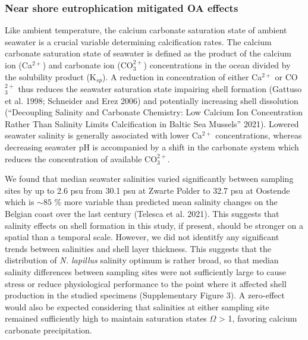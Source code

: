 \documentclass[smallextended]{svjour3}       %
\begin{document}
\hypertarget{near-shore-eutrophication-mitigated-oa-effects}{%
\subsubsection{Near shore eutrophication mitigated OA
effects}\label{near-shore-eutrophication-mitigated-oa-effects}}

Like ambient temperature, the calcium carbonate saturation state of
ambient seawater is a crucial variable determining calcification rates.
The calcium carbonate saturation state of seawater is defined as the
product of the calcium ion (Ca\(^{2+}\)) and carbonate ion
(CO\(_3^{2+}\)) concentrations in the ocean divided by the solubility
product (K\(_{sp}\)). A reduction in concentration of either Ca\(^{2+}\)
or CO\(_3^{2+}\) thus reduces the seawater saturation state impairing
shell formation (Gattuso et al. 1998; Schneider and Erez 2006) and
potentially increasing shell dissolution ({``Decoupling Salinity and
Carbonate Chemistry: Low Calcium Ion Concentration Rather Than Salinity
Limits Calcification in Baltic Sea Mussels''} 2021). Lowered seawater
salinity is generally associated with lower Ca\(^{2+}\) concentrations,
whereas decreasing seawater pH is accompanied by a shift in the
carbonate system which reduces the concentration of available
CO\(_3^{2+}\).

We found that median seawater salinities varied significantly between
sampling sites by up to 2.6 psu from 30.1 psu at Zwarte Polder to 32.7
psu at Oostende which is \(\sim85\) \% more variable than predicted mean
salinity changes on the Belgian coast over the last century (Telesca et
al. 2021). This suggests that salinity effects on shell formation in
this study, if present, should be stronger on a spatial than a temporal
scale. However, we did not identitfy any significant trends between
salinities and shell layer thickness. This suggests that the
distribution of \emph{N. lapillus} salinity optimum is rather broad, so
that median salinity differences between sampling sites were not
sufficiently large to cause stress or reduce physiological performance
to the point where it affected shell production in the studied specimens
(Supplementary Figure 3). A zero-effect would also be expected
considering that salinities at either sampling site remained
sufficiently high to maintain saturation states \(\Omega\)
\textgreater{} 1, favoring calcium carbonate precipitation.
\end{document}
